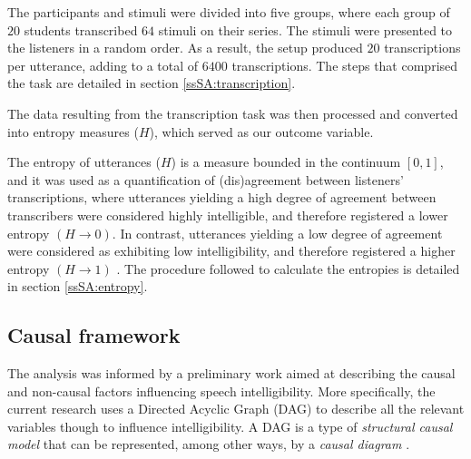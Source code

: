The participants and stimuli were divided into five groups, where each group of $20$ students transcribed $64$ stimuli on their series. The stimuli were presented to the listeners in a random order. As a result, the setup produced $20$ transcriptions per utterance, adding to a total of $6400$ transcriptions. The steps that comprised the task are detailed in section \ref{ssSA:transcription}. 
%
\begin{comment}
	present the stimuli based on the \textcolor{blue}{adaptive pairing algorithm} \citep{Pollitt_2012b}?
\end{comment}

The data resulting from the transcription task was then processed and converted into entropy measures ($H$), which served as our outcome variable. 

The entropy of utterances ($H$) is a measure bounded in the continuum $[0,1]$, and it was used as a quantification of (dis)agreement between listeners' transcriptions, where utterances yielding a high degree of agreement between transcribers were considered highly intelligible, and therefore registered a lower entropy $\left( H \rightarrow 0 \right)$. In contrast, utterances yielding a low degree of agreement were considered as exhibiting low intelligibility, and therefore registered a higher entropy $\left( H \rightarrow 1 \right)$ \citep{Boonen_et_al_2021, Faes_et_al_2021}. The procedure followed to calculate the entropies is detailed in section \ref{ssSA:entropy}.
%
\begin{comment}
	\textbf{for the experimenter:} Based on \citet{Faes_et_al_2021} we depict the procedure for the experimenter:
	\begin{enumerate}
		\item 1. matching procedure 
		\item selection of suitable stimuli
		\item determine the number of stimuli per judge 
	\end{enumerate}	
\end{comment}
%
%
\subsection{Causal framework} \label{sS:causal_frame}
%
The analysis was informed by a preliminary work aimed at describing the causal and non-causal factors influencing speech intelligibility. More specifically, the current research uses a Directed Acyclic Graph (DAG) to describe all the relevant variables though to influence intelligibility. A DAG is a type of \textit{structural causal model} that can be represented, among other ways, by a \textit{causal diagram} \cite{Pearl_2009, Cinelli_et_al_2021}. 

